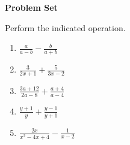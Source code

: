 \textbf{Problem Set}

\vspce

Perform the indicated  operation. 
\vspce

\begin{enumerate}[label = \arabic*. ]

\item \hspce  $\displaystyle \frac{a}{a-b} - \frac{b}{a+b}$ 
\vspce
\item \hspce  $\displaystyle \frac{3}{2x+1}+\frac{5}{3x-2}$ 
\vspce
\item \hspce  $\displaystyle \frac{3a+12}{2a-8}+\frac{a+4}{a-4}$
\vspce
\item \hspce  $\displaystyle \frac{y+1}{y} + \frac{y-1}{y+1}$
\vspce
\item \hspce $\displaystyle \frac{2x}{x^2-4x+4} - \frac{1}{x-2}$

\end{enumerate}